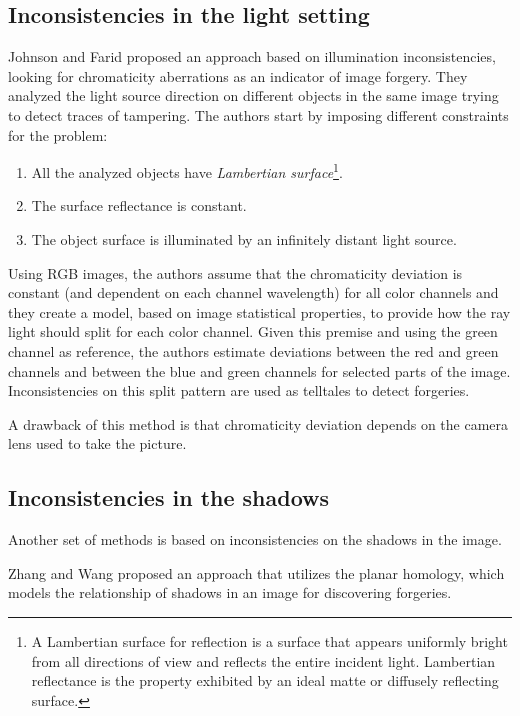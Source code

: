 \subsection{Inconsistencies in the light setting}

Johnson and Farid\cite{Johnson:2005:EDF:1073170.1073171} proposed an approach based on illumination inconsistencies, looking for chromaticity aberrations as an indicator of image forgery. They analyzed the light source direction on different objects in the same image trying to detect traces of tampering. The authors start by imposing different constraints for the problem:

\begin{enumerate}
\item All the analyzed objects have \emph{Lambertian surface}\footnote{A Lambertian surface for reflection is a surface that appears uniformly bright from all directions of view and reflects the entire incident light. Lambertian reflectance is the property exhibited by an ideal matte or diffusely reflecting surface.}\cite{mazin2015estimation}.
\item The surface reflectance is constant.
\item The object surface is illuminated by an infinitely distant light source.
\end{enumerate}

Using RGB images, the authors assume that the chromaticity deviation is constant (and dependent on each channel wavelength) for all color channels and they create a model, based on image statistical properties, to provide how the ray light should split for each color channel. Given this premise and using the green channel as reference, the authors estimate deviations between the red and green channels and between the blue and green channels for selected parts of the image. Inconsistencies on this split pattern are used as telltales to detect forgeries. 

A drawback of this method is that chromaticity deviation depends on the camera lens used to take the picture. 

\subsection{Inconsistencies in the shadows}

Another set of methods is based on inconsistencies on the shadows in the image.
 
Zhang and Wang \cite{zhang2009detecting} proposed an approach that utilizes the planar homology\cite{springer1964geometry}, which models the relationship of shadows in an image for discovering forgeries.

